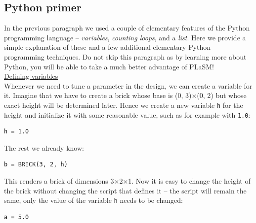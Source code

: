 \subsection{Python primer}

In the previous paragraph we used a couple of elementary 
features of the Python programming language -- {\em variables}, 
{\em counting loops}, and a {\em list}. Here we 
provide a simple explanation of these and a few additional 
elementary Python programming techniques. 
Do not skip this paragraph as by learning more about Python, 
you will be able to take a much better advantage of PLaSM!\\

\noindent
\underline{Defining variables}\\

\noindent
Whenever we need to tune a parameter in the design, we can create 
a variable for it. Imagine that we have to create a brick whose base
is (0, 3)$\times$(0, 2) but whose exact height will be determined 
later. Hence  we create a new variable {\tt h} for the height and initialize 
it with some reasonable value, such as for example with {\tt 1.0}:\\

\begin{bbox}
\begin{verbatim}
h = 1.0
\end{verbatim}
\end{bbox} 
\vspace{6mm}

\noindent
The rest we already know:\\

\begin{bbox}
\begin{verbatim}
b = BRICK(3, 2, h)
\end{verbatim}
\end{bbox} 
\vspace{6mm}

\noindent
This renders a brick of dimensions 3$\times$2$\times$1. Now it is easy to 
change the height of the brick without changing the script that defines it --
the script will remain the same, only the value of the variable {\tt h} needs
to be changed:\\

\begin{bbox}
\begin{verbatim}
a = 5.0
\end{verbatim}
\end{bbox} 
\vspace{6mm}

